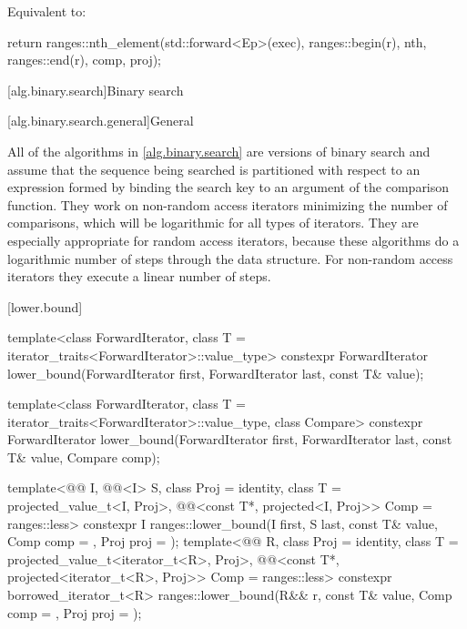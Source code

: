 \begin{itemdescr}
\pnum
\effects
Equivalent to:
\begin{codeblock}
return ranges::nth_element(std::forward<Ep>(exec), ranges::begin(r), nth, ranges::end(r),
                           comp, proj);
\end{codeblock}
\end{itemdescr}

[alg.binary.search]{Binary search}

[alg.binary.search.general]{General}

\pnum
All of the algorithms in \ref{alg.binary.search} are versions of binary search and
assume that the sequence being searched
is partitioned with respect to an expression
formed by binding the search key to an argument of the comparison function.
They work on non-random access iterators minimizing the number of comparisons,
which will be logarithmic for all types of iterators.
They are especially appropriate for random access iterators,
because these algorithms do a logarithmic number of steps
through the data structure.
For non-random access iterators they execute a linear number of steps.

[lower.bound]{}

%
\begin{itemdecl}
template<class ForwardIterator, class T = iterator_traits<ForwardIterator>::value_type>
  constexpr ForwardIterator
    lower_bound(ForwardIterator first, ForwardIterator last,
                const T& value);

template<class ForwardIterator, class T = iterator_traits<ForwardIterator>::value_type,
         class Compare>
  constexpr ForwardIterator
    lower_bound(ForwardIterator first, ForwardIterator last,
                const T& value, Compare comp);

template<@@ I, @@<I> S, class Proj = identity,
         class T = projected_value_t<I, Proj>,
         @@<const T*, projected<I, Proj>> Comp = ranges::less>
  constexpr I ranges::lower_bound(I first, S last, const T& value, Comp comp = {},
                                  Proj proj = {});
template<@@ R, class Proj = identity,
         class T = projected_value_t<iterator_t<R>, Proj>,
         @@<const T*, projected<iterator_t<R>, Proj>> Comp =
           ranges::less>
  constexpr borrowed_iterator_t<R>
    ranges::lower_bound(R&& r, const T& value, Comp comp = {}, Proj proj = {});
\end{itemdecl}

